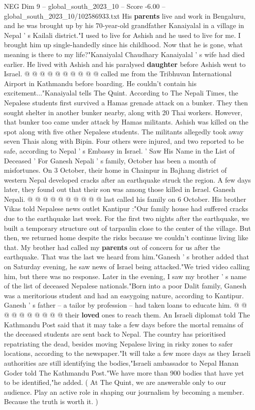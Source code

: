 \begin{textsample}{NEG Dim 9 – global\_south\_2023\_10 – Score -6.00 – global\_south\_2023\_10/102586933.txt}
His \textbf{parents} live and work in Bengaluru, and he was brought up by his 70-year-old grandfather Kanaiyalal in a village in Nepal ' s Kailali district."I used to live for Ashish and he used to live for me.
I brought him up single-handedly since his childhood.
Now that he is gone, what meaning is there to my life?"Kanaiyalal Chaudhary Kanaiyalal ' s wife had died earlier.
He lived with Ashish and his paralysed \textbf{daughter} before Ashish went to Israel. @ @ @ @ @ @ @ @ @ @ called me from the Tribhuvan International Airport in Kathmandu before boarding.
He couldn't contain his excitement..."Kanaiyalal tells The Quint.
According to The Nepali Times, the Nepalese students first survived a Hamas grenade attack on a bunker.
They then sought shelter in another bunker nearby, along with 20 Thai workers.
However, that bunker too came under attack by Hamas militants.
Ashish was killed on the spot along with five other Nepalese students.
The militants allegedly took away seven Thais along with Bipin.
Four others were injured, and two reported to be safe, according to Nepal ' s Embassy in Israel. ' Saw His Name in the List of Deceased ' For Ganesh Nepali ' s family, October has been a month of misfortunes.
On 3 October, their home in Chainpur in Bajhang district of western Nepal developed cracks after an earthquake struck the region.
A few days later, they found out that their son was among those killed in Israel.
Ganesh Nepali. @ @ @ @ @ @ @ @ @ @ last called his family on 6 October.
His brother Vikas told Nepalese news outlet Kantipur :"Our family house had suffered cracks due to the earthquake last week.
For the first two nights after the earthquake, we built a temporary structure out of tarpaulin close to the center of the village.
But then, we returned home despite the risks because we couldn't continue living like that.
My brother had called my \textbf{parents} out of concern for us after the earthquake.
That was the last we heard from him."Ganesh ' s brother added that on Saturday evening, he saw news of Israel being attacked."We tried video calling him, but there was no response.
Later in the evening, I saw my brother ' s name of the list of deceased Nepalese nationals."Born into a poor Dalit family, Ganesh was a meritorious student and had an easygoing nature, according to Kantipur.
Ganesh ' s father -- a tailor by profession -- had taken loans to educate him. @ @ @ @ @ @ @ @ @ @ their \textbf{loved} ones to reach them.
An Israeli diplomat told The Kathmandu Post said that it may take a few days before the mortal remains of the deceased students are sent back to Nepal.
The country has prioritised repatriating the dead, besides moving Nepalese living in risky zones to safer locations, according to the newspaper."It will take a few more days as they Israeli authorities are still identifying the bodies,"Israeli ambassador to Nepal Hanan Goder told The Kathmandu Post."We have more than 900 bodies that have yet to be identified,"he added. ( At The Quint, we are answerable only to our audience.
Play an active role in shaping our journalism by becoming a member.
Because the truth is worth it. )

\end{textsample}
